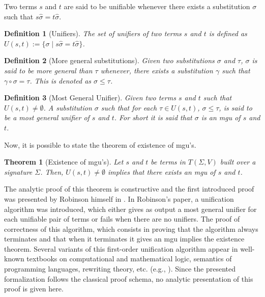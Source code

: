 \documentclass[submission,copyright,creativecommons]{eptcs}
\newtheorem{definition}{Definition}
\newtheorem{theorem}{Theorem}
\begin{document}
  Two terms $s$ and $t$ are said to be unifiable whenever there exists
  a substitution $\sigma$ such that $s\hat{\sigma} = t\hat{\sigma}$.
  
\begin{definition}[Unifiers]
  The set of unifiers of two terms $s$ and $t$ is defined as $U(s,t)
  := \{ \sigma \; |\; s\hat{\sigma} = t\hat{\sigma}\}$.
\end{definition}

\begin{definition}[More general substitutions]
  Given two substitutions $\sigma$ and $\tau$, $\sigma$ is said to be
  more general than $\tau$ whenever, there exists a substitution
  $\gamma$ such that $\gamma\circ\sigma = \tau$.  This is denoted as
  $\sigma \leq \tau$.
\end{definition}

\begin{definition}[Most General Unifier]
  Given two terms $s$ and $t$ such that $U(s,t)\not=\emptyset$. A
  substitution $\sigma$ such that for each $\tau\in U(s,t)$, $\sigma
  \leq \tau$, is said to be a most general unifier of $s$ and $t$. For
  short it is said that $\sigma$ is an mgu of $s$ and $t$.
\end{definition}

Now, it is possible to state the theorem of existence of mgu's.
 
\begin{theorem}[Existence of mgu's] 
  Let $s$ and $t$ be terms in $T(\Sigma,V)$ built over a signature $\Sigma$. Then,
  $U(s,t)\not=\emptyset$ implies that there exists an mgu of $s$ and
  $t$.
\end{theorem}

The analytic proof of this theorem is constructive and the first
introduced proof was presented by Robinson himself in \cite{Ro65}. In
Robinson's paper, a unification algorithm was introduced, which either
gives as output a most general unifier for each unifiable pair of
terms or fails when there are no unifiers.  The proof of correctness
of this algorithm, which consists in proving that the algorithm always
terminates and that when it terminates it gives an mgu implies the
existence theorem. Several variants of this first-order unification
algorithm appear in well-known textbooks on computational and
mathematical logic, semantics of programming languages, rewriting
theory, etc. (e.g.,
\cite{Llo87,EbFlTh84,Bu98,Te2003,BaNi98,Hi97}). Since the presented
formalization follows the classical proof schema, no analytic
presentation of this proof is given here.
\end{document}
